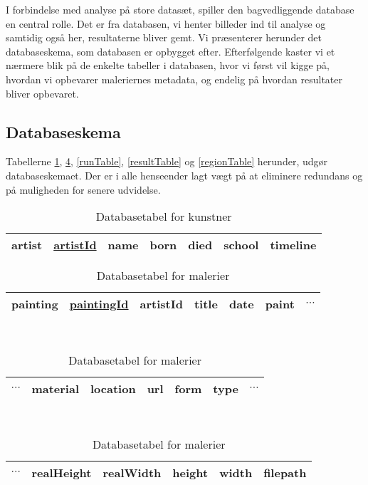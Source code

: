 {
{\sffamily I forbindelse med analyse på store datasæt, spiller den
bagvedliggende database en central rolle. Det er fra databasen, vi
henter billeder ind til analyse og samtidig også her, resultaterne
bliver gemt. Vi præsenterer herunder det databaseskema, som databasen er
opbygget efter.  Efterfølgende kaster vi et nærmere blik på de enkelte
tabeller i databasen, hvor vi først vil kigge på, hvordan vi opbevarer
maleriernes metadata, og endelig på hvordan resultater bliver opbevaret.
}

\subsection{Databaseskema}
Tabellerne \ref{artistTable}, \ref{paintingTable}, \ref{runTable},
\ref{resultTable} og \ref{regionTable} herunder, udgør databaseskemaet.
Der er i alle henseender lagt vægt på at eliminere redundans og på
muligheden for senere udvidelse.

\begin{table}[!h]
    \centering
    \begin{tabular}{|l||c|c|c|c|c|c|}
        \hline
        \bf{artist} \hspace{0.5cm} & \underline{artistId} & name & born & died & school & timeline \\\hline
    \end{tabular}
    \caption{Databasetabel for kunstner}
    \label{artistTable}
\end{table}

\begin{table}[!h]
    \centering
    \begin{tabular}{|l||c|c|c|c|c|c}
        \hline
        \bf{painting} \hspace{0.5cm} & \underline{paintingId} & artistId & title & date & paint & $\cdots$ \\\hline
    \end{tabular}\\ \vspace{0.2cm}\hspace{1.2cm}
    \begin{tabular}{c|c|c|c|c|c|c}
        \hline
        $\cdots$ & material & location & url & form & type & $\cdots$ \\\hline
    \end{tabular}\\ \vspace{0.2cm}\hspace{1.4cm}
    \begin{tabular}{c|c|c|c|c|c|}
        \hline
        $\cdots$ & realHeight & realWidth & height & width & filepath \\\hline
    \end{tabular}
    \caption{Databasetabel for malerier}
    \label{paintingTable}
\end{table}

}
